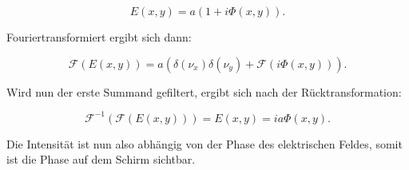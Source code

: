 \begin{equation}
	E(x, y) = a\left( 1 + i\Phi\left( x, y\right) \right) .
\end{equation}

Fouriertransformiert ergibt sich dann:

\begin{equation}
	\mathcal{F}\left( E\left( x, y\right) \right)  = a\left( \delta\left( \nu_x\right) \delta\left( \nu_y\right) + \mathcal{F}\left( i\Phi\left( x, y\right) \right) \right) .
\end{equation}

Wird nun der erste Summand gefiltert, ergibt sich nach der Rücktransformation:

\begin{equation}
	\mathcal{F}^{-1}\left( \mathcal{F}\left( E\left( x, y\right) \right) \right) = E\left( x, y\right) = ia\Phi\left( x, y\right) .
\end{equation}

Die Intensität ist nun also abhängig von der Phase des elektrischen Feldes, somit ist die Phase auf dem Schirm sichtbar.

